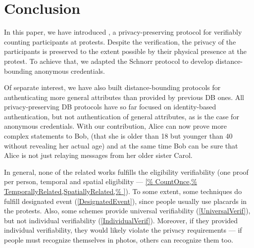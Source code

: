 \section{Conclusion}%
\label{Conclusion}

In this paper, we have introduced \PRIVO, a privacy-preserving protocol for verifiably counting participants at protests. 
Despite the verification, the privacy of the participants is preserved to the extent possible by their physical presence at the protest. 
To achieve that, we adapted the Schnorr protocol to develop distance-bounding anonymous credentials. 

Of separate interest, we have also built distance-bounding protocols for authenticating more general attributes than provided by previous \ac{DB} ones.
All privacy-preserving \ac{DB} protocols have so far focused on identity-based authentication, but not authentication of general attributes, as is the case for anonymous credentials.
With our contribution, Alice can now prove more complex statements to Bob, (\eg  that she is older than 18 but younger than 40 without revealing her actual age) and at the same time Bob can be sure that Alice is not just relaying messages from her older sister Carol.

In general, none of the related works fulfills the eligibility
verifiability (one proof per person, temporal and spatial eligibility ---
\cref{%
  CountOnce,%
  TemporallyRelated,SpatiallyRelated,%
}).
To some extent, some techniques do fulfill designated event (\cref{DesignatedEvent}), since people usually use placards in the protests.
Also, some schemes provide universal verifiability (\cref{UniversalVerif}), but not individual verifiability (\cref{IndividualVerif}).
Moreover, if they provided individual verifiability, they would likely violate 
the privacy requirements --- if people must recognize themselves in photos, 
others can recognize them too.

